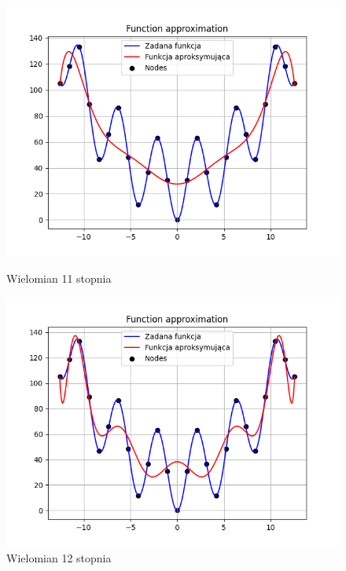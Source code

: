 \documentclass{article}
\begin{document}
\begin{figure}[H]
  \begin{minipage}[b]{0.49\textwidth}
    \begin{minipage}[b]{\textwidth}
      \includegraphics[width=\textwidth]{img21.png}
      \caption{Wielomian 11 stopnia}
    \end{minipage}
    \vspace*{\fill}
    \begin{minipage}[b]{\textwidth}
      \includegraphics[width=\textwidth]{img22.png}
      \caption{Wielomian 12 stopnia}
    \end{minipage}
  \end{minipage}
  \hfill
  \begin{minipage}[b]{0.49\textwidth}

\end{minipage}
\end{figure}
\end{document}
